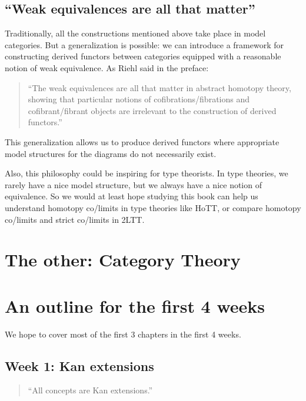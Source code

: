\documentclass[11pt]{article}
\newcommand{\calC}{\mathcal{C}}
\begin{document}
\subsection{``Weak equivalences are all that matter''}
Traditionally, all the constructions mentioned above take place in model categories.
But a generalization is possible: we can introduce a framework
for constructing derived functors between categories equipped with a reasonable notion of
weak equivalence. As Riehl said in the preface:

\begin{quote}
``The weak equivalences are all that matter in abstract homotopy theory, showing
that particular notions of cofibrations/fibrations and cofibrant/fibrant objects are irrelevant
to the construction of derived functors.''
\end{quote}

This generalization allows us to produce derived functors where
appropriate model structures for the diagrams do not necessarily exist.

Also, this philosophy could be inspiring for type theorists.
In type theories, we rarely have a nice model structure,
but we always have a nice notion of equivalence.
So we would at least hope studying this book can help us understand
homotopy co/limits in type theories like HoTT,
or compare homotopy co/limits and strict co/limits in 2LTT.

\section{The other: Category Theory}

\section{An outline for the first 4 weeks}

We hope to cover most of the first 3 chapters in the first 4 weeks.

\subsection{Week 1: Kan extensions}
\begin{quote}
``All concepts are Kan extensions.''
\end{quote}
\end{document}
